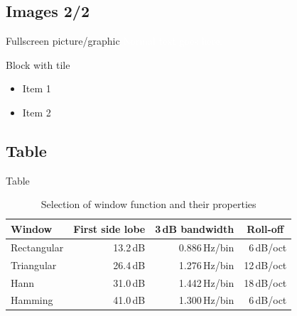 \documentclass[compress]{beamer}
\begin{document}
\subsection{Images 2/2}
{
    \begin{frame}{Fullscreen picture/graphic}
        \textcolor{white}{
            Normal text goes here.
        }
        \begin{block}{Block with tile}
            \begin{itemize}
                \item Item 1
                \item Item 2
            \end{itemize}
        \end{block}
    \end{frame}
}



\subsection{Table}
\begin{frame}{Table}
    \begin{table}[]
        \caption{Selection of window function and their properties}
        \begin{tabular}[]{lrrr}
            \toprule
            \textbf{Window}			& \multicolumn{1}{c}{\textbf{First side lobe}}
            & \multicolumn{1}{c}{\textbf{3\,dB bandwidth}}
            & \multicolumn{1}{c}{\textbf{Roll-off}} \\
            \midrule
            Rectangular				& 13.2\,dB	& 0.886\,Hz/bin	& 6\,dB/oct		\\[0.25em]
            Triangular				& 26.4\,dB	& 1.276\,Hz/bin	& 12\,dB/oct	\\[0.25em]
            Hann					& 31.0\,dB	& 1.442\,Hz/bin	& 18\,dB/oct	\\[0.25em]
            Hamming					& 41.0\,dB	& 1.300\,Hz/bin	& 6\,dB/oct		\\
            \bottomrule
        \end{tabular}
        \label{tab:WindowFunctions}
    \end{table}
\end{frame}


\end{document}
